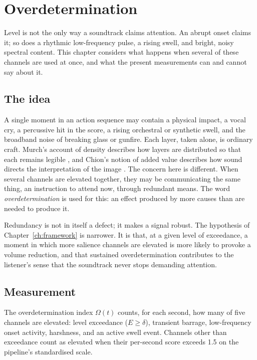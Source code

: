 \chapter{Overdetermination}
\label{ch:overdetermination}

Level is not the only way a soundtrack claims attention. An abrupt onset claims it; so does a rhythmic low-frequency pulse, a rising swell, and bright, noisy spectral content. This chapter considers what happens when several of these channels are used at once, and what the present measurements can and cannot say about it.

\section{The idea}

A single moment in an action sequence may contain a physical impact, a vocal cry, a percussive hit in the score, a rising orchestral or synthetic swell, and the broadband noise of breaking glass or gunfire. Each layer, taken alone, is ordinary craft. Murch's account of density describes how layers are distributed so that each remains legible \citep{murch2005}, and Chion's notion of added value describes how sound directs the interpretation of the image \citep{chion1994}. The concern here is different. When several channels are elevated together, they may be communicating the same thing, an instruction to attend now, through redundant means. The word \emph{overdetermination} is used for this: an effect produced by more causes than are needed to produce it.

Redundancy is not in itself a defect; it makes a signal robust. The hypothesis of Chapter~\ref{ch:framework} is narrower. It is that, at a given level of exceedance, a moment in which more salience channels are elevated is more likely to provoke a volume reduction, and that sustained overdetermination contributes to the listener's sense that the soundtrack never stops demanding attention.

\section{Measurement}

The overdetermination index $\Omega(t)$ counts, for each second, how many of five channels are elevated: level exceedance ($E\ge\delta$), transient barrage, low-frequency onset activity, harshness, and an active swell event. Channels other than exceedance count as elevated when their per-second score exceeds 1.5 on the pipeline's standardised scale.

